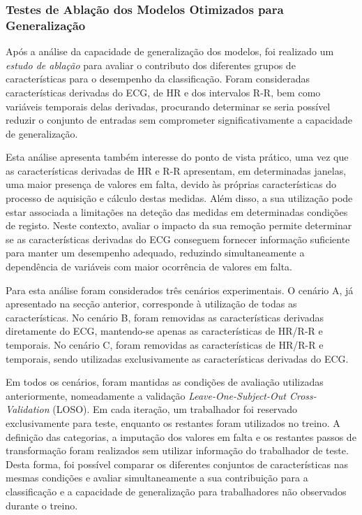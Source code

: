 \subsubsection*{Testes de Ablação dos Modelos Otimizados para Generalização}

Após a análise da capacidade de generalização dos modelos, foi realizado um \textit{estudo de ablação} para avaliar o contributo dos diferentes grupos de características para o desempenho da classificação. Foram consideradas características derivadas do ECG, de HR e dos intervalos R-R, bem como variáveis temporais delas derivadas, procurando determinar se seria possível reduzir o conjunto de entradas sem comprometer significativamente a capacidade de generalização.

Esta análise apresenta também interesse do ponto de vista prático, uma vez que as características derivadas de HR e R-R apresentam, em determinadas janelas, uma maior presença de valores em falta, devido às próprias características do processo de aquisição e cálculo destas medidas. Além disso, a sua utilização pode estar associada a limitações na deteção das medidas em determinadas condições de registo. Neste contexto, avaliar o impacto da sua remoção permite determinar se as características derivadas do ECG conseguem fornecer informação suficiente para manter um desempenho adequado, reduzindo simultaneamente a dependência de variáveis com maior ocorrência de valores em falta.

Para esta análise foram considerados três cenários experimentais. O cenário A, já apresentado na secção anterior, corresponde à utilização de todas as características. No cenário B, foram removidas as características derivadas diretamente do ECG, mantendo-se apenas as características de HR/R-R e temporais. No cenário C, foram removidas as características de HR/R-R e temporais, sendo utilizadas exclusivamente as características derivadas do ECG.

Em todos os cenários, foram mantidas as condições de avaliação utilizadas anteriormente, nomeadamente a validação \textit{Leave-One-Subject-Out Cross-Validation} (LOSO). Em cada iteração, um trabalhador foi reservado exclusivamente para teste, enquanto os restantes foram utilizados no treino. A definição das categorias, a imputação dos valores em falta e os restantes passos de transformação foram realizados sem utilizar informação do trabalhador de teste. Desta forma, foi possível comparar os diferentes conjuntos de características nas mesmas condições e avaliar simultaneamente a sua contribuição para a classificação e a capacidade de generalização para trabalhadores não observados durante o treino.

